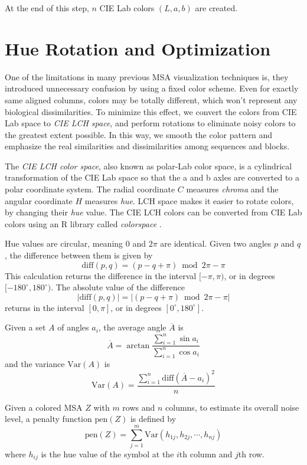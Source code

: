 At the end of this step, $n$ CIE Lab colors $(L, a, b)$ are created.

\section{Hue Rotation and Optimization}

One of the limitations in many previous MSA visualization techniques is, they introduced unnecessary confusion by using a fixed color scheme. Even for exactly same aligned columns, colors may be totally different, which won't represent any biological dissimilarities. To minimize this effect, we convert the colors from CIE Lab space to \emph{CIE LCH space}, and perform rotations to eliminate noisy colors to the greatest extent possible. In this way, we smooth the color pattern and emphasize the real similarities and dissimilarities among sequences and blocks.

The \emph{CIE LCH color space}, also known as polar-Lab color space, is a cylindrical transformation of the CIE Lab space so that the a and b axles are converted to a polar coordinate system. The radial coordinate $C$ measures \emph{chroma} and the angular coordinate $H$ measures \emph{hue}. LCH space makes it easier to rotate colors, by changing their \emph{hue} value. The CIE LCH colors can be converted from CIE Lab colors using an R library called \emph{colorspace} \cite{Ihaka:2009aa,Zeileis:2009aa}.

Hue values are circular, meaning $0$ and $2\pi$ are identical. Given two angles $p$ and $q$, the difference between them is given by $$\mathrm{diff}(p,q) = (p - q + \pi) \bmod 2\pi - \pi$$ This calculation returns the difference in the interval $[-\pi, \pi)$, or in degrees $[-180^{\circ}, 180^{\circ})$. The absolute value of the difference $$|\mathrm{diff}(p,q)| = |(p - q + \pi) \bmod 2\pi - \pi|$$ returns in the interval $[0, \pi]$, or in degrees $[0^{\circ}, 180^{\circ}]$.

Given a set $A$ of angles $a_i$, the average angle $\overline{A}$ is $$\overline{A}=\arctan{\frac{\displaystyle\sum_{i=1}^n \sin{a_i}}{\displaystyle\sum_{i=1}^n \cos{a_i}}}$$ and the variance $\mathrm{Var}(A)$ is $$\mathrm{Var}(A)=\frac{\displaystyle\sum_{i=1}^n \mathrm{diff}(\overline{A}-a_i)^2}{n}$$

Given a colored MSA $Z$ with $m$ rows and $n$ columns, to estimate its overall noise level, a penalty function $\mathrm{pen}(Z)$ is defined by $$\mathrm{pen}(Z)=\displaystyle\sum_{j=1}^m \mathrm{Var}(h_{1j},h_{2j},\cdots,h_{nj})$$ where $h_{ij}$ is the hue value of the symbol at the $i$th column and $j$th row.

